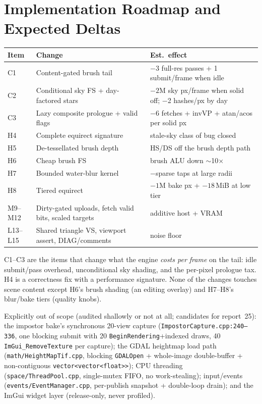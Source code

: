 \documentclass[11pt,a4paper]{article}
\begin{document}
\section{Implementation Roadmap and Expected Deltas}

\begin{table}[h]
\centering
\small
\begin{tabular}{@{}lp{5.8cm}p{5.6cm}@{}}
\toprule
\textbf{Item} & \textbf{Change} & \textbf{Est.\ effect} \\
\midrule
C1 & Content-gated brush tail & $-3$ full-res passes + 1 submit/frame when idle \\
C2 & Conditional sky FS + day-factored stars & $-2$M sky px/frame when solid off; $-$2 hashes/px by day \\
C3 & Lazy composite prologue + valid flags & $-$6 fetches + invVP + atan/acos per solid px \\
H4 & Complete equirect signature & stale-sky class of bug closed \\
H5 & De-tessellated brush depth & HS/DS off the brush depth path \\
H6 & Cheap brush FS & brush ALU down $\sim$10$\times$ \\
H7 & Bounded water-blur kernel & $-$sparse taps at large radii \\
H8 & Tiered equirect & $-1$M bake px + $-18$\,MiB at low tier \\
M9--M12 & Dirty-gated uploads, fetch valid bits, scaled targets & additive host + VRAM \\
L13--L15 & Shared triangle VS, viewport assert, DIAG/comments & noise floor \\
\bottomrule
\end{tabular}
\end{table}

C1--C3 are the items that change what the engine \emph{costs per frame} on
the tail: idle submit/pass overhead, unconditional sky shading, and the
per-pixel prologue tax. H4 is a correctness fix with a performance
signature. None of the changes touches scene content except H6's brush
shading (an editing overlay) and H7--H8's blur/bake tiers (quality knobs).

Explicitly out of scope (audited shallowly or not at all; candidates for
report~25): the impostor bake's synchronous 20-view capture
(\texttt{ImpostorCapture.cpp:240--336}, one blocking submit with 20
\texttt{BeginRendering}+indexed draws, 40 \texttt{ImGui\_RemoveTexture} per
capture); the GDAL heightmap load path (\texttt{math/HeightMapTif.cpp},
blocking \texttt{GDALOpen} + whole-image double-buffer +
non-contiguous \texttt{vector<vector<float>>}); CPU threading
(\texttt{space/ThreadPool.cpp}, single-mutex FIFO, no work-stealing);
input/events (\texttt{events/EventManager.cpp}, per-publish snapshot +
double-loop drain); and the ImGui widget layer (release-only, never
profiled).
\end{document}
